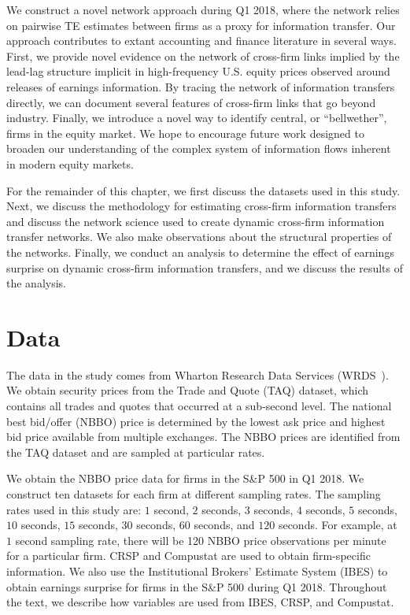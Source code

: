 We construct a novel network approach during Q1 2018, where the network relies on pairwise TE estimates between firms as a proxy for information transfer. Our approach contributes to extant accounting and finance literature in several ways.  First, we provide novel evidence on the network of cross-firm links implied by the lead-lag structure implicit in high-frequency U.S. equity prices observed around releases of earnings information.  By tracing the network of information transfers directly,  we can document several features of cross-firm links that go beyond industry.  Finally, we introduce a novel way to identify central,  or “bellwether”,  firms in the equity market.  We hope to encourage future work designed to broaden our understanding of the complex system of information flows inherent in modern equity markets. 

For the remainder of this chapter,  we first discuss the datasets used in this study.   Next, we discuss the methodology for estimating cross-firm information transfers and discuss the network science used to create dynamic cross-firm information transfer networks. We also make observations about the structural properties of the networks.  Finally, we  conduct an analysis to determine the effect of earnings surprise on dynamic cross-firm information transfers, and we discuss the results of the analysis. 

\section{Data}
The data in the study comes from Wharton Research Data Services (WRDS~). We obtain security prices from the Trade and Quote (TAQ) dataset, which contains all trades and quotes that occurred at a sub-second level. The national best bid/offer (NBBO) price is determined by the lowest ask price and highest bid price available from multiple exchanges. The NBBO prices are identified from the TAQ dataset and are sampled at particular rates. 

We obtain the NBBO price data for firms in the S\&P 500 in Q1 2018.  We construct ten datasets for each firm at different sampling rates. The sampling rates used in this study are: $1$ second,  $2$ seconds,  $3$ seconds,  $4$ seconds,  $5$ seconds, $10$ seconds,  $15$ seconds,  $30$ seconds,  $60$ seconds,  and $120$ seconds.  For example, at $1$ second sampling rate, there will be 120 NBBO price observations per minute for a particular firm.  CRSP and Compustat are used to obtain firm-specific information.  We also use the Institutional Brokers' Estimate System (IBES) to obtain earnings surprise for firms in the S\&P 500 during Q1 2018.  Throughout the text, we describe how variables are used from IBES, CRSP, and Compustat. 

